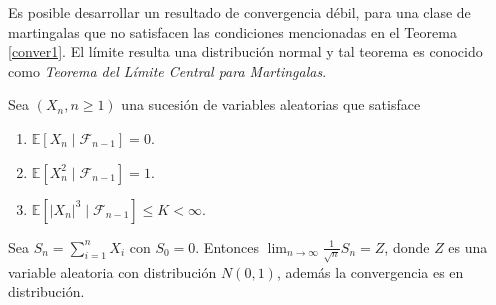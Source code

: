 Es posible desarrollar un resultado de convergencia débil, para una clase de martingalas que no satisfacen las condiciones mencionadas en el Teorema \ref{conver1}. El límite resulta una distribución normal  y tal teorema es conocido como \emph{Teorema del Límite Central para Martingalas}.

\begin{theorem}
\label{conver3}
Sea $(X_n, n \geq 1)$ una sucesión de variables aleatorias que satisface
	\begin{enumerate}
	\item $\mathbb{E}[X_n \mid \mathcal{F}_{n-1}] = 0$.
	\item $\mathbb{E}[X_n^2 \mid \mathcal{F}_{n-1}] = 1$.
	\item $\mathbb{E}[|X_n|^3 \mid \mathcal{F}_{n-1}] \leq K < \infty$.
	\end{enumerate}
Sea $S_n = \sum_{i=1}^n X_i$ con $S_0 = 0$. Entonces $\lim_{n \rightarrow \infty} \frac{1}{\sqrt{n}} S_n = Z$, donde $Z$ es una variable aleatoria con distribución $N(0, 1)$, además la convergencia es en distribución.
\end{theorem}

